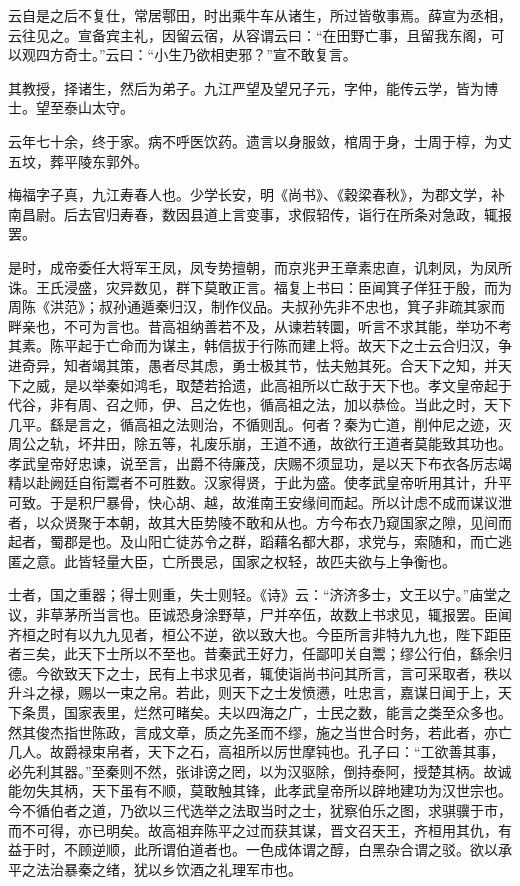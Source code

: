 \documentclass[12pt,UTF8]{ctexbook}
\begin{document}
云自是之后不复仕，常居鄠田，时出乘牛车从诸生，所过皆敬事焉。薛宣为丞相，云往见之。宣备宾主礼，因留云宿，从容谓云曰：“在田野亡事，且留我东阁，可以观四方奇士。”云曰：“小生乃欲相吏邪？”宣不敢复言。



其教授，择诸生，然后为弟子。九江严望及望兄子元，字仲，能传云学，皆为博士。望至泰山太守。



云年七十余，终于家。病不呼医饮药。遗言以身服敛，棺周于身，士周于椁，为丈五坟，葬平陵东郭外。



梅福字子真，九江寿春人也。少学长安，明《尚书》、《穀梁春秋》，为郡文学，补南昌尉。后去官归寿春，数因县道上言变事，求假轺传，诣行在所条对急政，辄报罢。



是时，成帝委任大将军王凤，凤专势擅朝，而京兆尹王章素忠直，讥刺凤，为凤所诛。王氏浸盛，灾异数见，群下莫敢正言。福复上书曰：臣闻箕子佯狂于殷，而为周陈《洪范》；叔孙通遁秦归汉，制作仪品。夫叔孙先非不忠也，箕子非疏其家而畔亲也，不可为言也。昔高祖纳善若不及，从谏若转圜，听言不求其能，举功不考其素。陈平起于亡命而为谋主，韩信拔于行陈而建上将。故天下之士云合归汉，争进奇异，知者竭其策，愚者尽其虑，勇士极其节，怯夫勉其死。合天下之知，并天下之威，是以举秦如鸿毛，取楚若拾遗，此高祖所以亡敌于天下也。孝文皇帝起于代谷，非有周、召之师，伊、吕之佐也，循高祖之法，加以恭俭。当此之时，天下几平。繇是言之，循高祖之法则治，不循则乱。何者？秦为亡道，削仲尼之迹，灭周公之轨，坏井田，除五等，礼废乐崩，王道不通，故欲行王道者莫能致其功也。孝武皇帝好忠谏，说至言，出爵不待廉茂，庆赐不须显功，是以天下布衣各厉志竭精以赴阙廷自衔鬻者不可胜数。汉家得贤，于此为盛。使孝武皇帝听用其计，升平可致。于是积尸暴骨，快心胡、越，故淮南王安缘间而起。所以计虑不成而谋议泄者，以众贤聚于本朝，故其大臣势陵不敢和从也。方今布衣乃窥国家之隙，见间而起者，蜀郡是也。及山阳亡徒苏令之群，蹈藉名都大郡，求党与，索随和，而亡逃匿之意。此皆轻量大臣，亡所畏忌，国家之权轻，故匹夫欲与上争衡也。



士者，国之重器；得士则重，失士则轻。《诗》云：“济济多士，文王以宁。”庙堂之议，非草茅所当言也。臣诚恐身涂野草，尸并卒伍，故数上书求见，辄报罢。臣闻齐桓之时有以九九见者，桓公不逆，欲以致大也。今臣所言非特九九也，陛下距臣者三矣，此天下士所以不至也。昔秦武王好力，任鄙叩关自鬻；缪公行伯，繇余归德。今欲致天下之士，民有上书求见者，辄使诣尚书问其所言，言可采取者，秩以升斗之禄，赐以一束之帛。若此，则天下之士发愤懑，吐忠言，嘉谋日闻于上，天下条贯，国家表里，烂然可睹矣。夫以四海之广，士民之数，能言之类至众多也。然其俊杰指世陈政，言成文章，质之先圣而不缪，施之当世合时务，若此者，亦亡几人。故爵禄束帛者，天下之石，高祖所以厉世摩钝也。孔子曰：“工欲善其事，必先利其器。”至秦则不然，张诽谤之罔，以为汉驱除，倒持泰阿，授楚其柄。故诚能勿失其柄，天下虽有不顺，莫敢触其锋，此孝武皇帝所以辟地建功为汉世宗也。今不循伯者之道，乃欲以三代选举之法取当时之士，犹察伯乐之图，求骐骥于市，而不可得，亦已明矣。故高祖弃陈平之过而获其谋，晋文召天王，齐桓用其仇，有益于时，不顾逆顺，此所谓伯道者也。一色成体谓之醇，白黑杂合谓之驳。欲以承平之法治暴秦之绪，犹以乡饮酒之礼理军市也。
\end{document}
